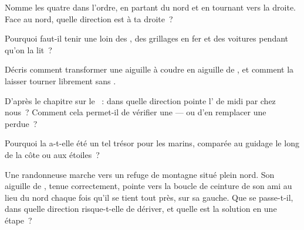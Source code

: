 \begin{exercise}[$\star$]\label{exo:g4:magnets-and-compass:5}
Nomme les quatre  dans l'ordre, en partant du nord et
en tournant vers la droite. Face au nord, quelle direction est à ta
droite~?
\end{exercise}

\begin{exercise}[$\star$]\label{exo:g4:magnets-and-compass:6}
Pourquoi faut-il tenir une  loin des , des grillages
en fer et des voitures pendant qu'on la lit~?
\end{exercise}

\begin{exercise}[$\star$]\label{exo:g4:magnets-and-compass:7}
Décris comment transformer une aiguille à coudre en aiguille de
, et comment la laisser tourner librement sans .
\end{exercise}

\begin{exercise}[$\star$]\label{exo:g4:magnets-and-compass:8}
D'après le chapitre sur le ~: dans quelle direction
pointe l' de midi par chez nous~? Comment cela permet-il de
vérifier une  --- ou d'en remplacer une perdue~?
\end{exercise}

\begin{exercise}[$\star$]\label{exo:g4:magnets-and-compass:9}
Pourquoi la  a-t-elle été un tel trésor pour les marins,
comparée au guidage le long de la côte ou aux étoiles~?
\end{exercise}

\begin{exercise}[$\star\star$]\label{exo:g4:magnets-and-compass:10}
Une randonneuse marche vers un refuge de montagne situé plein nord.
Son aiguille de , tenue correctement, pointe vers la boucle
de ceinture de son ami au lieu du nord chaque fois qu'il se tient
tout près, sur sa gauche. Que se passe-t-il, dans quelle direction
risque-t-elle de dériver, et quelle est la solution en une étape~?
\end{exercise}

